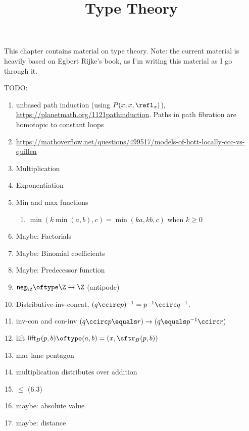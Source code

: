 

%



\title{Type Theory}

\maketitle

\label{section-phantom}

This chapter contains material on type theory. Note: the current material is heavily based on Egbert Rijke's book, as I'm writing this material as I go through it.

\ChapterTableOfContents

TODO:
\begin{enumerate}
    \item unbased path induction (using $P(x,x,\refl_{x})$), \url{https://planetmath.org/1121pathinduction}. Paths in path fibration are homotopic to constant loops
    \item \url{https://mathoverflow.net/questions/499517/models-of-hott-locally-ccc-vs-quillen}
    \item Multiplication
    \item Exponentiation
    \item Min and max functions
        \begin{enumerate}
            \item $\min(k\min(a,b),c)=\min(ka,kb,c)$ when $k\geq0$
        \end{enumerate}
    \item Maybe: Factorials
    \item Maybe: Binomial coefficients
    \item Maybe: Predecessor function
    \item $\mathsf{neg}_{\Z}\oftype\Z\to\Z$ (antipode)
    \item Distributive-inv-concat, $(q\ccirc p)^{-1}=p^{-1}\ccirc q^{-1}$.
    \item inv-con and con-inv $(q\ccirc p\equals r)\to(q\equals p^{-1}\ccirc r)$
    \item lift $\mathsf{lift}_{B}(p,b)\oftype (a,b)=(x,\sftr_{B}(p,b))$
    \item mac lane pentagon
    \item multiplication distributes over addition
    \item $\leq$ (6.3)
    \item maybe: absolute value
    \item maybe: distance

\end{enumerate}
